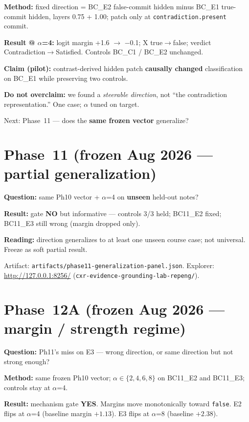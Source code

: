 \documentclass[11pt,a4paper]{article}
\begin{document}
\textbf{Method:} fixed direction = BC\_E2 false-commit hidden minus BC\_E1 true-commit hidden, layers 0.75 + 1.00; patch only at \texttt{contradiction.present} commit.

\textbf{Result @ $\alpha$=4:} logit margin +1.6 $\rightarrow$ $-$0.1; X true$\rightarrow$false; verdict Contradiction$\rightarrow$Satisfied. Controls BC\_C1 / BC\_E2 unchanged.

\textbf{Claim (pilot):} contrast-derived hidden patch \textbf{causally changed} classification on BC\_E1 while preserving two controls.

\textbf{Do not overclaim:} we found a \emph{steerable direction}, not ``the contradiction representation.'' One case; $\alpha$ tuned on target.

Next: Phase~11 --- does the \textbf{same frozen vector} generalize?

\section{Phase~11 (frozen Aug 2026 --- partial generalization)}

\textbf{Question:} same Ph10 vector + $\alpha$=4 on \textbf{unseen} held-out notes?

\textbf{Result:} gate \textbf{NO} but informative --- controls 3/3 held; BC11\_E2 fixed; BC11\_E3 still wrong (margin dropped only).

\textbf{Reading:} direction generalizes to at least one unseen course case; not universal. Freeze as soft partial result.

Artifact: \texttt{artifacts/phase11-generalization-panel.json}. Explorer: \url{http://127.0.0.1:8256/} (\texttt{cxr-evidence-grounding-lab-repeng/}).

\section{Phase~12A (frozen Aug 2026 --- margin / strength regime)}

\textbf{Question:} Ph11's miss on E3 --- wrong direction, or same direction but not strong enough?

\textbf{Method:} same frozen Ph10 vector; $\alpha\in\{2,4,6,8\}$ on BC11\_E2 and BC11\_E3; controls stay at $\alpha$=4.

\textbf{Result:} mechanism gate \textbf{YES}. Margins move monotonically toward \texttt{false}. E2 flips at $\alpha$=4 (baseline margin $+1.13$). E3 flips at $\alpha$=8 (baseline $+2.38$).
\end{document}

